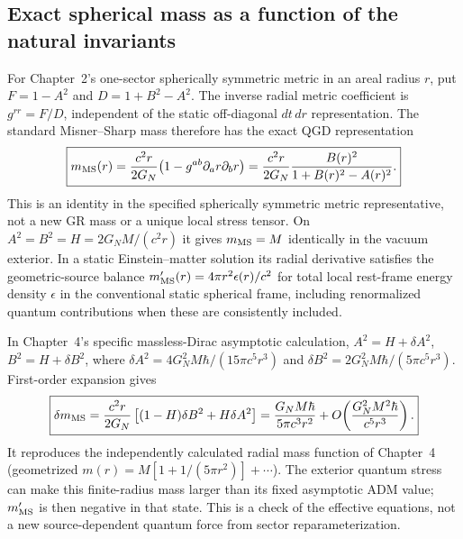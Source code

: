 \documentclass[11pt,a4paper]{article}
\begin{document}
\subsection{Exact spherical mass as a function of the natural invariants}
\label{sec:qgd139-ms}
For Chapter~2's one-sector spherically symmetric metric in an areal
radius $r$, put $F=1-A^2$ and $D=1+B^2-A^2$. The inverse radial
metric coefficient is $g^{rr}=F/D$, independent of the
static off-diagonal $dt\,dr$ representation. The standard
Misner--Sharp mass therefore has the exact QGD representation
\begin{equation}\label{eq:qgd139-misnersharp}
\boxed{m_{\rm MS}(r)=\frac{c^2r}{2G_N}
\bigl(1-g^{ab}\partial_a r\partial_b r\bigr)
=\frac{c^2r}{2G_N}\frac{B(r)^2}{1+B(r)^2-A(r)^2}.}
\end{equation}
This is an identity in the specified spherically symmetric metric
representative, not a new GR mass or a unique local stress tensor.
On $A^2=B^2=H=2G_NM/(c^2r)$ it gives $m_{\rm MS}=M$
identically in the vacuum exterior. In a static Einstein--matter
solution its radial derivative satisfies the geometric-source
balance $m_{\rm MS}'(r)=4\pi r^2\epsilon(r)/c^2$ for total local
rest-frame energy density $\epsilon$ in the conventional static
spherical frame, including renormalized quantum contributions
when these are consistently included.

In Chapter~4's specific massless-Dirac asymptotic calculation,
$A^2=H+\delta A^2$, $B^2=H+\delta B^2$,
where $\delta A^2=4G_N^2M\hbar/(15\pi c^5r^3)$ and
$\delta B^2=2G_N^2M\hbar/(5\pi c^5r^3)$. First-order expansion gives
\begin{equation}\label{eq:qgd139-msquantum}
\boxed{\delta m_{\rm MS}=
\frac{c^2r}{2G_N}\left[(1-H)\delta B^2+H\delta A^2\right]
=\frac{G_NM\hbar}{5\pi c^3r^2}
+O\!\left(\frac{G_N^2M^2\hbar}{c^5r^3}\right).}
\end{equation}
It reproduces the independently calculated radial mass function of
Chapter~4 (geometrized $m(r)=M[1+1/(5\pi r^2)]+\cdots$).
The exterior quantum stress can make this finite-radius mass larger
than its fixed asymptotic ADM value; $m_{\rm MS}'$ is then negative
in that state. This is a check of the effective equations, not a
new source-dependent quantum force from sector reparameterization.
\end{document}
